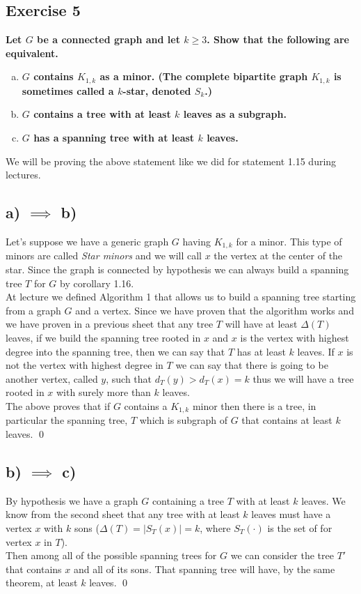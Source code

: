 \subsection*{Exercise 5}
\boldmath
\textbf{Let $G$ be a connected graph and let $k \geq 3$. Show that the following are equivalent.}
\unboldmath
\begin{enumerate}[a)]
    \boldmath
    \item \textbf{$G$ contains $K_{1,k}$ as a minor. (The complete bipartite graph $K_{1,k}$ is sometimes called a $k$-star, denoted $S_k$.)}
    \unboldmath

    \boldmath
    \item \textbf{$G$ contains a tree with at least $k$ leaves as a subgraph.}
    \unboldmath

    \boldmath
    \item \textbf{$G$ has a spanning tree with at least $k$ leaves.}
    \unboldmath
\end{enumerate}
We will be proving the above statement like we did for statement 1.15 during lectures.
\subsection*{a) $\implies$ b)}
Let's suppose we have a generic graph $G$ having $K_{1, k}$ for a minor. This type of minors are called \textit{Star minors} and we will call $x$ the vertex at the center of the star. Since the graph is connected by hypothesis we can always build a spanning tree $T$ for $G$ by corollary 1.16.\\
\linebreak
At lecture we defined Algorithm 1 that allows us to build a spanning tree starting from a graph $G$ and a vertex. Since we have proven that the algorithm works and we have proven in a previous sheet that any tree $T$ will have at least $\Delta(T)$ leaves, if we build the spanning tree rooted in $x$ and $x$ is the vertex with highest degree into the spanning tree, then we can say that $T$ has at least $k$ leaves. If $x$ is not the vertex with highest degree in $T$ we can say that there is going to be another vertex, called $y$, such that $d_T(y) > d_T(x) = k$ thus we will have a tree rooted in $x$ with surely more than $k$ leaves.\\
\linebreak
The above proves that if $G$ contains a $K_{1, k}$ minor then there is a tree, in particular the spanning tree, $T$ which is subgraph of $G$ that contains at least $k$ leaves. \qed
\subsection*{b) $\implies$ c)}
By hypothesis we have a graph $G$ containing a tree $T$ with at least $k$ leaves. We know from the second sheet that any tree with at least $k$ leaves must have a vertex $x$ with $k$ sons ($\Delta(T) = |S_T(x)| = k$, where $S_T(\cdot)$ is the set of for vertex $x$ in $T$).\\
\linebreak
Then among all of the possible spanning trees for $G$ we can consider the tree $T'$ that contains $x$ and all of its sons. That spanning tree will have, by the same theorem, at least $k$ leaves. \qed

